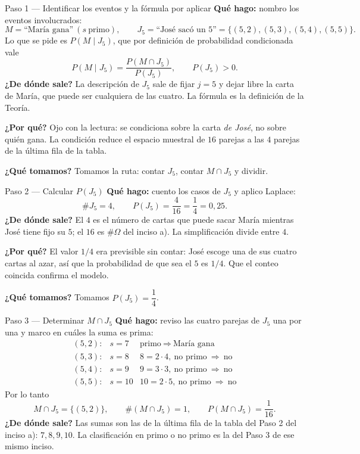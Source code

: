 \documentclass[11pt]{article}
\begin{document}
\begin{sol}
\begin{paso}{Paso 1 --- Identificar los eventos y la fórmula por aplicar}
\textbf{Qué hago:} nombro los eventos involucrados:
\[
M=\text{``María gana''}\ (s\ \text{primo}),\qquad
J_5=\text{``José sacó un 5''}=\{(5,2),(5,3),(5,4),(5,5)\}.
\]
Lo que se pide es $P(M\mid J_5)$, que por definición de probabilidad condicionada vale
\[
P(M\mid J_5)=\frac{P(M\cap J_5)}{P(J_5)},\qquad P(J_5)>0 .
\]
\textbf{¿De dónde sale?} La descripción de $J_5$ sale de fijar $j=5$ y dejar libre la carta de
María, que puede ser cualquiera de las cuatro. La fórmula es la definición de la Teoría.

\textbf{¿Por qué?} Ojo con la lectura: se condiciona sobre la carta \emph{de José}, no sobre
quién gana. La condición reduce el espacio muestral de $16$ parejas a las $4$ parejas de la
última fila de la tabla.

\textbf{¿Qué tomamos?} Tomamos la ruta: contar $J_5$, contar $M\cap J_5$ y dividir.
\end{paso}

\begin{paso}{Paso 2 --- Calcular $P(J_5)$}
\textbf{Qué hago:} cuento los casos de $J_5$ y aplico Laplace:
\[
\#J_5=4,
\qquad
P(J_5)=\frac{4}{16}=\frac{1}{4}=0{,}25 .
\]
\textbf{¿De dónde sale?} El $4$ es el número de cartas que puede sacar María mientras José
tiene fijo su $5$; el $16$ es $\#\Omega$ del inciso a). La simplificación divide entre $4$.

\textbf{¿Por qué?} El valor $1/4$ era previsible sin contar: José escoge una de sus cuatro
cartas al azar, así que la probabilidad de que sea el $5$ es $1/4$. Que el conteo coincida
confirma el modelo.

\textbf{¿Qué tomamos?} Tomamos $P(J_5)=\dfrac{1}{4}$.
\end{paso}

\begin{paso}{Paso 3 --- Determinar $M\cap J_5$}
\textbf{Qué hago:} reviso las cuatro parejas de $J_5$ una por una y marco en cuáles la suma es
prima:
\[
\begin{array}{lll}
(5,2): & s=7 & \text{primo}\ \Rightarrow\ \text{María gana}\\
(5,3): & s=8 & 8=2\cdot4,\ \text{no primo}\ \Rightarrow\ \text{no}\\
(5,4): & s=9 & 9=3\cdot3,\ \text{no primo}\ \Rightarrow\ \text{no}\\
(5,5): & s=10 & 10=2\cdot5,\ \text{no primo}\ \Rightarrow\ \text{no}
\end{array}
\]
Por lo tanto
\[
M\cap J_5=\{(5,2)\},\qquad \#(M\cap J_5)=1,\qquad P(M\cap J_5)=\frac{1}{16}.
\]
\textbf{¿De dónde sale?} Las sumas son las de la última fila de la tabla del Paso 2 del inciso
a): $7,8,9,10$. La clasificación en primo o no primo es la del Paso 3 de ese mismo inciso.


\end{paso}
\end{sol}
\end{document}
